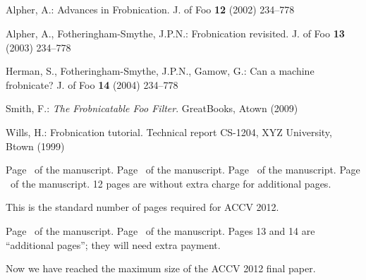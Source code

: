 \documentclass[runningheads]{llncs}
\begin{document}
\subsection {}





\begin{thebibliography}{1}

Alpher, A.:
Advances in Frobnication.
J. of Foo
\textbf{12} (2002)  234--778

Alpher, A., Fotheringham-Smythe, J.P.N.:
Frobnication revisited.
J. of Foo
\textbf{13} (2003)  234--778

Herman, S., Fotheringham-Smythe, J.P.N., Gamow, G.:
Can a machine frobnicate?
J. of Foo
\textbf{14} (2004)  234--778

Smith, F.:
{\it The Frobnicatable Foo Filter}.
GreatBooks, Atown (2009)

Wills, H.:
Frobnication tutorial.
Technical report CS-1204, XYZ University, Btown (1999)

\end{thebibliography}


\clearpage\mbox{}Page \thepage\ of the manuscript.
\clearpage\mbox{}Page \thepage\ of the manuscript.
\clearpage\mbox{}Page \thepage\ of the manuscript.
\clearpage\mbox{}Page \thepage\ of the manuscript.
12 pages are without extra charge for additional pages.
\par\vfill\par
This is the standard number of pages required for ACCV 2012.

\clearpage\mbox{}Page \thepage\ of the manuscript.
\clearpage\mbox{}Page \thepage\ of the manuscript.
Pages 13 and 14 are ``additional pages''; they will need extra payment.
\par\vfill\par
Now we have reached the maximum size of the ACCV 2012 final paper.
\end{document}
